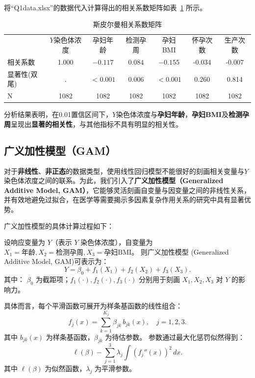 \documentclass[12pt]{ctexart}
\begin{document}
	将“Q1data.xlsx”的数据代入计算得出的相关系数矩阵如表~\ref{spearman} 所示。
	\begin{table}[htbp]
		\centering
		\caption{斯皮尔曼相关系数矩阵}
		\begin{threeparttable}
			\setlength{\tabcolsep}{5pt} %
			\begin{tabular}{lcccccc} 
				\toprule & $Y$染色体浓度 & 孕妇年龄 & 检测孕周 & 孕妇BMI & 怀孕次数 & 生产次数 \\
				\cmidrule(lr){1-7}
				相关系数
				& 1.000 & $-0.117$ & $0.084$ & $-0.155$ & -0.034 & -0.007 \\
				显著性(双尾)
				& . & $<0.001$ & 0.006 & $<0.001$ & 0.260 & 0.814 \\
				N
				& 1082 & 1082 & 1082 & 1082 & 1082 & 1082 \\
				\bottomrule
			\end{tabular}
		\end{threeparttable}
		\label{spearman}
	\end{table}
	
	分析结果表明，在0.01置信区间下，$Y$染色体浓度与\textbf{孕妇年龄}，\textbf{孕妇BMI}及\textbf{检测孕周}呈现出\textbf{显著的相关性}，与其他指标不具有明显的相关性。
	
	
	\subsection{广义加性模型（GAM）}
	对于\textbf{非线性}、\textbf{非正态}的数据类型，使用线性回归模型不能很好的刻画相关变量与$Y$染色体浓度之间的联系。为此，我们引入了\textbf{广义加性模型（Generalized Additive Model, GAM）}，它能够灵活刻画自变量与因变量之间的非线性关系，并有效地避免过拟合，在医学等需要揭示多因素复杂作用关系的研究中具有显著优势。
	
	广义加性模型的具体计算过程如下：
	
	设响应变量为 $Y$（表示 $Y$ 染色体浓度），自变量为
	$X_1 = \text{年龄},
	X_2 = \text{检测孕周}, 
	X_3 = \text{孕妇BMI}$。
	则广义加性模型 (Generalized Additive Model, GAM)可表示为：
	\begin{equation}
		Y
		= \beta_0 + f_1(X_1) + f_2(X_2) + f_3(X_3).
	\end{equation}
	其中：
 $\beta_0$ 为截距项；$f_1(\cdot), f_2(\cdot), f_3(\cdot)$ 分别用于刻画 $X_1, X_2, X_3$ 对 $Y$ 的影响力。


	
	具体而言，每个平滑函数可展开为样条基函数的线性组合：
	\begin{equation}
		f_j(x) = \sum_{k=1}^{K_j} \beta_{jk}\, b_{jk}(x), \quad j=1,2,3.
	\end{equation}
	其中 $b_{jk}(x)$ 为样条基函数，$\beta_{jk}$ 为待估参数。
	参数通过最大化惩罚似然得到：
	\begin{equation}
		\ell(\beta) - \sum_{j=1}^3 \lambda_j \int \left(f_j''(x)\right)^2 \, dx.
	\end{equation}
	其中 $\ell(\beta)$ 为似然函数，$\lambda_j$ 为平滑参数。
	
\end{document}

